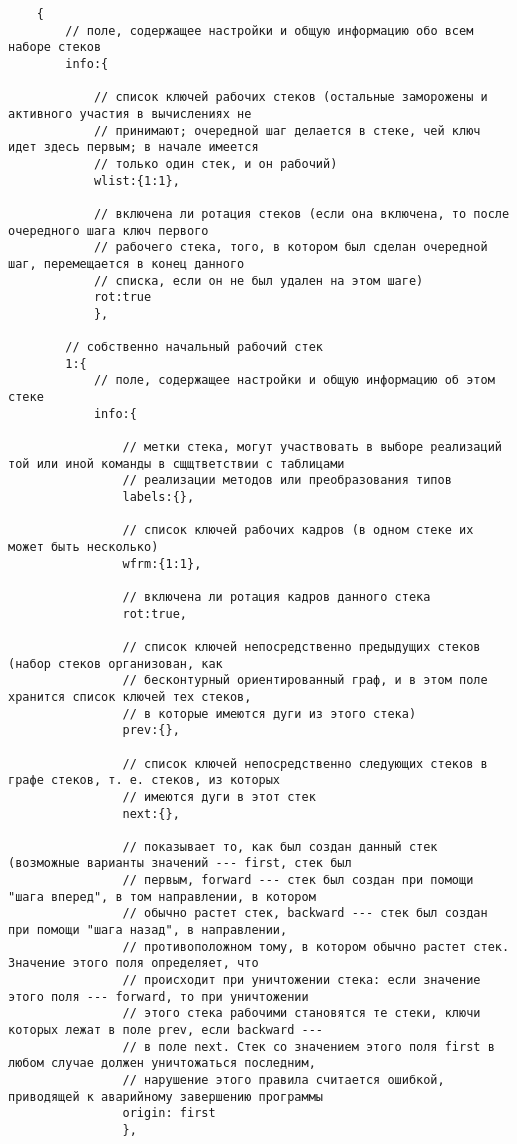 \documentclass{report}
\begin{document}
    \begin{verbatim}
    {
        // поле, содержащее настройки и общую информацию обо всем наборе стеков
        info:{

            // список ключей рабочих стеков (остальные заморожены и активного участия в вычислениях не
            // принимают; очередной шаг делается в стеке, чей ключ идет здесь первым; в начале имеется
            // только один стек, и он рабочий)
            wlist:{1:1},

            // включена ли ротация стеков (если она включена, то после очередного шага ключ первого
            // рабочего стека, того, в котором был сделан очередной шаг, перемещается в конец данного
            // списка, если он не был удален на этом шаге)
            rot:true
            },

        // собственно начальный рабочий стек
        1:{
            // поле, содержащее настройки и общую информацию об этом стеке
            info:{

                // метки стека, могут участвовать в выборе реализаций той или иной команды в сщщтветствии с таблицами
                // реализации методов или преобразования типов
                labels:{},

                // список ключей рабочих кадров (в одном стеке их может быть несколько)
                wfrm:{1:1},

                // включена ли ротация кадров данного стека
                rot:true,

                // список ключей непосредственно предыдущих стеков (набор стеков организован, как
                // бесконтурный ориентированный граф, и в этом поле хранится список ключей тех стеков,
                // в которые имеются дуги из этого стека)
                prev:{},

                // список ключей непосредственно следующих стеков в графе стеков, т. е. стеков, из которых
                // имеются дуги в этот стек
                next:{},

                // показывает то, как был создан данный стек (возможные варианты значений --- first, стек был
                // первым, forward --- стек был создан при помощи "шага вперед", в том направлении, в котором
                // обычно растет стек, backward --- стек был создан при помощи "шага назад", в направлении,
                // противоположном тому, в котором обычно растет стек. Значение этого поля определяет, что
                // происходит при уничтожении стека: если значение этого поля --- forward, то при уничтожении
                // этого стека рабочими становятся те стеки, ключи которых лежат в поле prev, если backward ---
                // в поле next. Стек со значением этого поля first в любом случае должен уничтожаться последним,
                // нарушение этого правила считается ошибкой, приводящей к аварийному завершению программы
                origin: first
                },


\end{verbatim}
\end{document}
